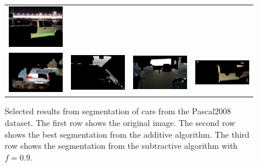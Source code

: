 \documentclass[10pt,twocolumn,letterpaper]{article}
\begin{document}
\begin{figure}[p]
\begin{tabular}{ p{4cm} p{4cm} p{4cm} p{4cm} }
\includegraphics[width=3.95cm]{figures/results/a2008_002198.jpg.eps} \\
\includegraphics[width=3.95cm]{figures/results/b2008_000052.jpg.eps} &
\includegraphics[width=3.95cm]{figures/results/b2008_000828.jpg.eps} &
\includegraphics[width=3.95cm]{figures/results/b2008_000952.jpg.eps} &
\includegraphics[width=3.95cm]{figures/results/b2008_002198.jpg.eps} \\
\end{tabular}
\caption{Selected results from segmentation of cars from the Pascal2008
dataset.  The first row shows the original image.  The second row shows
the best segmentation from the additive algorithm.  The third row shows
the segmentation from the subtractive algorithm with $f=0.9$.}
\label{fig:good_results}
\end{figure}
\end{document}
